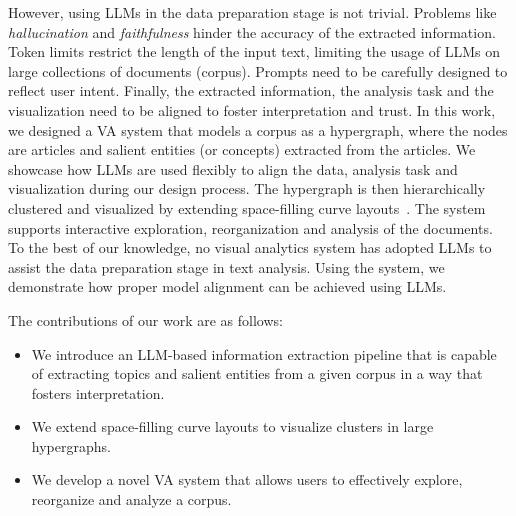 However, using LLMs in the data preparation stage is not trivial. 
Problems like \textit{hallucination} and \textit{faithfulness} hinder the accuracy of the extracted information.
Token limits restrict the length of the input text, limiting the usage of LLMs on large collections of documents (corpus).
Prompts need to be carefully designed to reflect user intent.
Finally, the extracted information, the analysis task and the visualization need to be aligned to foster interpretation and trust.
In this work, we designed a VA system that models a corpus as a hypergraph, where the nodes are articles and salient entities (or concepts) extracted from the articles.
We showcase how LLMs are used flexibly to align the data, analysis task and visualization during our design process.
The hypergraph is then hierarchically clustered and visualized by extending space-filling curve layouts~\cite{muelder2008sfc}.
The system supports interactive exploration, reorganization and analysis of the documents.
To the best of our knowledge, no visual analytics system has adopted LLMs to assist the data preparation stage in text analysis.
Using the system, we demonstrate how proper model alignment can be achieved using LLMs.

The contributions of our work are as follows:
\begin{itemize}
    \item We introduce an LLM-based information extraction pipeline that is capable of extracting topics and salient entities from a given corpus in a way that fosters interpretation.
    \item We extend space-filling curve layouts to visualize clusters in large hypergraphs.
    \item We develop a novel VA system that allows users to effectively explore, reorganize and analyze a corpus.
\end{itemize}










